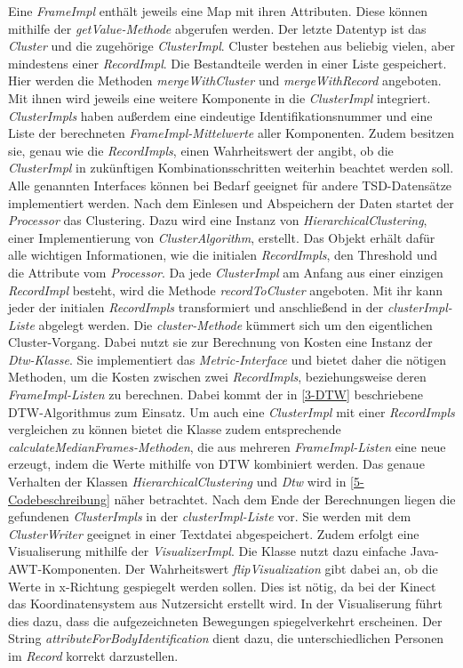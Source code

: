 Eine \emph{FrameImpl} enthält jeweils eine Map mit ihren Attributen.
Diese können mithilfe der \emph{getValue-Methode} abgerufen werden.
Der letzte Datentyp ist das \emph{Cluster} und die zugehörige \emph{ClusterImpl}.
Cluster bestehen aus beliebig vielen, aber mindestens einer \emph{RecordImpl}.
Die Bestandteile werden in einer Liste gespeichert.
Hier werden die Methoden \emph{mergeWithCluster} und \emph{mergeWithRecord} angeboten.
Mit ihnen wird jeweils eine weitere Komponente in die \emph{ClusterImpl} integriert.
\emph{ClusterImpls} haben außerdem eine eindeutige Identifikationsnummer und eine Liste der berechneten
\emph{FrameImpl-Mittelwerte} aller Komponenten.
Zudem besitzen sie, genau wie die \emph{RecordImpls}, einen Wahrheitswert der angibt,
ob die \emph{ClusterImpl} in zukünftigen Kombinationsschritten weiterhin beachtet werden soll.
Alle genannten Interfaces können bei Bedarf geeignet für andere \ac{TSD}-Datensätze implementiert werden.
Nach dem Einlesen und Abspeichern der Daten startet der \emph{Processor} das Clustering.
Dazu wird eine Instanz von \emph{HierarchicalClustering}, einer Implementierung von \emph{ClusterAlgorithm}, erstellt.
Das Objekt erhält dafür alle wichtigen Informationen,
wie die initialen \emph{RecordImpls}, den Threshold und die Attribute vom \emph{Processor}.
Da jede \emph{ClusterImpl} am Anfang aus einer einzigen \emph{RecordImpl} besteht,
wird die Methode \emph{recordToCluster} angeboten.
Mit ihr kann jeder der initialen \emph{RecordImpls} transformiert
und anschließend in der \emph{clusterImpl-Liste} abgelegt werden.
Die \emph{cluster-Methode} kümmert sich um den eigentlichen Cluster-Vorgang.
Dabei nutzt sie zur Berechnung von Kosten eine Instanz der \emph{Dtw-Klasse}.
Sie implementiert das \emph{Metric-Interface} und bietet daher die nötigen Methoden,
um die Kosten zwischen zwei \emph{RecordImpls}, beziehungsweise deren \emph{FrameImpl-Listen} zu berechnen.
Dabei kommt der in \autoref{3-DTW} beschriebene \ac{DTW}-Algorithmus zum Einsatz.
Um auch eine \emph{ClusterImpl} mit einer \emph{RecordImpls} vergleichen zu können bietet die Klasse zudem entsprechende
\emph{calculateMedianFrames-Methoden}, die aus mehreren \emph{FrameImpl-Listen} eine neue erzeugt,
indem die Werte mithilfe von \ac{DTW} kombiniert werden.
Das genaue Verhalten der Klassen \emph{HierarchicalClustering} und \emph{Dtw} wird in \autoref{5-Codebeschreibung} näher betrachtet.
Nach dem Ende der Berechnungen liegen die gefundenen \emph{ClusterImpls} in der \emph{clusterImpl-Liste} vor.
Sie werden mit dem \emph{ClusterWriter} geeignet in einer Textdatei abgespeichert.
Zudem erfolgt eine Visualiserung mithilfe der \emph{VisualizerImpl}.
Die Klasse nutzt dazu einfache Java-AWT-Komponenten.
Der Wahrheitswert \emph{flipVisualization} gibt dabei an,
ob die Werte in x-Richtung gespiegelt werden sollen.
Dies ist nötig, da bei der Kinect das Koordinatensystem aus Nutzersicht erstellt wird.
In der Visualiserung führt dies dazu, dass die aufgezeichneten Bewegungen spiegelverkehrt erscheinen.
Der String \emph{attributeForBodyIdentification} dient dazu,
die unterschiedlichen Personen im \emph{Record} korrekt darzustellen.

